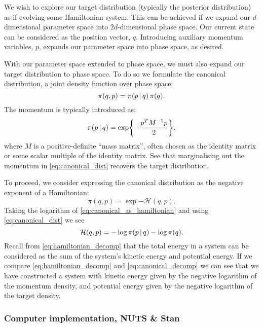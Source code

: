 We wish to explore our target distribution (typically the posterior distribution) as if
evolving some Hamiltonian system. This can be achieved if we expand our $d$-dimensional
parameter space into $2d$-dimensional phase space. Our current state can be considered as
the position vector, $q$. Introducing auxiliary momentum variables, $p$, expands
our parameter space into phase space, as desired.

With our parameter space extended to phase space, we must also expand our target
distribution to phase space. To do so we formulate the canonical distribution, a joint
density function over phase space:
\begin{equation}
  \label{eq:canonical_dist}
  \pi(q, p) = \pi(p \,|\, q) \, \pi(q).
\end{equation}
The momentum is typically introduced as:
\begin{equation}
  \pi(p \,|\, q) = \exp{-\frac{p^T M^{-1} p}{2}},
\end{equation}
where $M$ is a positive-definite ``mass matrix'', often chosen as the identity matrix or
some scalar multiple of the identity matrix. See that marginalising out the momentum in
\cref{eq:canonical_dist} recovers the target distribution.

To proceed, we consider expressing the canonical distribution as the
negative exponent of a Hamiltonian:
\begin{equation}
  \label{eq:canonical_as_hamiltonian}
  \pi(q, p) = \exp{-\mathcal{H}(q,p)}.
\end{equation}
Taking the logarithm of \cref{eq:canonical_as_hamiltonian} and using \cref{eq:canonical_dist}
we see
\begin{equation}
  \label{eq:canonical_decomp}
  \mathcal{H}(q, p) = -\log{\pi(p \,|\,q)} - \log{\pi(q)}.
\end{equation}
Recall from \cref{eq:hamiltonian_decomp} that the total energy in a system can be
considered as the sum of the system's kinetic energy and potential energy.  If we compare
\cref{eq:hamiltonian_decomp} and \cref{eq:canonical_decomp} we can see that we have
constructed a system with kinetic energy given by the negative logarithm of the momentum
density, and potential energy given by the negative logarithm of the target density.

\subsubsection{Computer implementation, NUTS \& Stan}

